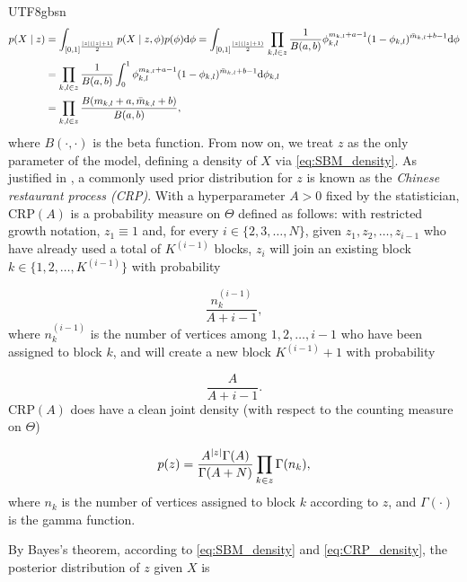 \documentclass[12pt]{report}
\theoremstyle{plain}
\theoremstyle{definition}
\begin{document}
\begin{CJK*}{UTF8}{gbsn}
\begin{equation}\label{eq:SBM_density}
  \begin{split}
  p(X \mid z) & =  \int_{[0,1]^{\frac{\abs{z}(\abs{z}+1)}{2}}} p(X \mid z, \phi)p(\phi) \mathrm{d} \phi
  = \int_{[0,1]^{\frac{\abs{z}(\abs{z}+1)}{2}}} 
  \prod_{k, l \in z} \frac{1}{B(a,b)}\phi_{k, l}^{m_{k,l}+a-1} (1-\phi_{k, l})^{\bar{m}_{k,l}+b-1}  \mathrm{d} \phi
 \\ & = \prod_{k, l \in z} \frac{1}{B(a,b)} \int_0^1 \phi_{k, l}^{m_{k,l}+a-1} (1-\phi_{k, l})^{\bar{m}_{k,l}+b-1}  \mathrm{d} \phi_{k,l}
  \\ & =
  \prod_{k, l \in z} 
  \frac{B(m_{k,l}+a, \bar{m}_{k,l}+b)}{B(a,b)},
  \end{split}
\end{equation}
where $B(\cdot, \cdot)$ is the beta function.
From now on, we treat $z$ as the only parameter of the model,
defining a density of $X$ via \eqref{eq:SBM_density}.
As justified in \cite{Schmidt_Morup_2013},
a commonly used prior distribution for $z$
is known as the \textit{Chinese restaurant process (CRP)}.
With a hyperparameter $A > 0$ fixed by the statistician,
$\text{CRP}(A)$ is a probability measure on $\Theta$ defined as 
follows: with restricted growth notation,
$z_1 \equiv 1$ and, for every $i \in \{2, 3, \ldots, N\}$,
given $z_1, z_2, \ldots, z_{i-1}$ who have already used a total of 
$K^{(i-1)}$ blocks, 
$z_i$ will join an existing block $k \in \{1, 2, \ldots, K^{(i-1)}\}$ with probability

\begin{equation*}
  \frac{n_k^{(i-1)}}{A + i - 1},
\end{equation*}
where $n_k^{(i-1)}$ is the number of vertices among $1, 2, \ldots, i-1$
who have been assigned to block $k$,
and will create a new block $K^{(i-1)} + 1$ with probability

\begin{equation*}
  \frac{A}{A + i - 1}.
\end{equation*}
$\text{CRP}(A)$ does have a clean joint density (with respect to the counting measure on $\Theta$)

\begin{equation}\label{eq:CRP_density}
 p(z) = \frac{A^{\abs{z}} \Gamma(A)}{\Gamma(A + N)} \prod_{k \in z} \Gamma(n_k),
\end{equation}
where
$n_k$ is the number of vertices assigned to block $k$ according to $z$,
and $\Gamma(\cdot)$ is the gamma function.

By Bayes's theorem, according to \eqref{eq:SBM_density}
and \eqref{eq:CRP_density},
the posterior distribution of $z$ given $X$ is


\end{CJK*}
\end{document}
